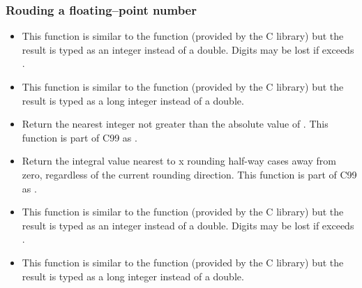 \subsubsection{Rouding a floating--point number}
\begin{itemize}
  \item {}
    \sshortdescribe This function is similar to the  function
    (provided by the C library) but the result is typed as an integer instead of a
    double. Digits may be lost if  exceeds .
  \item {}
    \sshortdescribe This function is similar to the  function
    (provided by the C library) but the result is typed as a long integer instead of a
    double. 
  \item {}
    \sshortdescribe Return the nearest integer not greater than the absolute
    value of . This function is part of C99 as .
  \item {}
    \sshortdescribe Return the integral value nearest to x rounding
    half-way cases away from zero, regardless of the current rounding
    direction. This function is part of C99 as .
  \item {}
    \sshortdescribe This function is similar to the  function
    (provided by the C library) but the result is typed as an integer instead of a
    double. Digits may be lost if  exceeds .
  \item {}
    \sshortdescribe This function is similar to the  function
    (provided by the C library) but the result is typed as a long integer instead of a
    double. 
\end{itemize}

